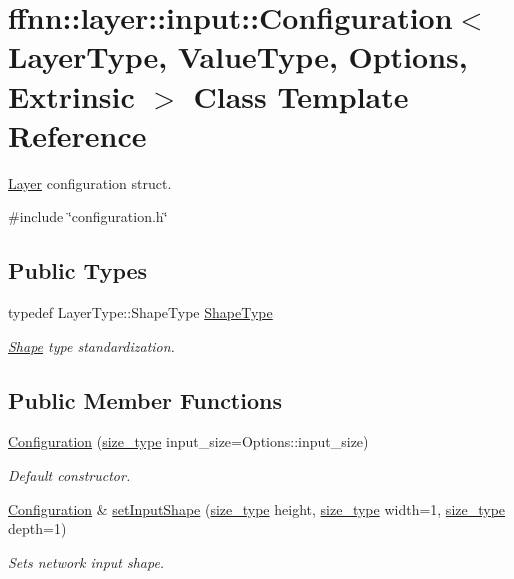 \hypertarget{classffnn_1_1layer_1_1input_1_1_configuration}{\section{ffnn\-:\-:layer\-:\-:input\-:\-:Configuration$<$ Layer\-Type, Value\-Type, Options, Extrinsic $>$ Class Template Reference}
\label{classffnn_1_1layer_1_1input_1_1_configuration}
}


\hyperlink{classffnn_1_1layer_1_1_layer}{Layer} configuration struct.  




{\ttfamily \#include \char`\"{}configuration.\-h\char`\"{}}

\subsection*{Public Types}
\begin{DoxyCompactItemize}
\item 
typedef Layer\-Type\-::\-Shape\-Type \hyperlink{classffnn_1_1layer_1_1input_1_1_configuration_afc336872262117979921b387f4a6a257}{Shape\-Type}
\begin{DoxyCompactList}\small\item\em \hyperlink{structffnn_1_1layer_1_1_shape}{Shape} type standardization. \end{DoxyCompactList}\end{DoxyCompactItemize}
\subsection*{Public Member Functions}
\begin{DoxyCompactItemize}
\item 
\hyperlink{classffnn_1_1layer_1_1input_1_1_configuration_afdf39d6de4b1945d588333f39acc8141}{Configuration} (\hyperlink{namespaceffnn_a63b90a2fd70eb76684eac482a51633e5}{size\-\_\-type} input\-\_\-size=Options\-::input\-\_\-size)
\begin{DoxyCompactList}\small\item\em Default constructor. \end{DoxyCompactList}\item 
\hyperlink{classffnn_1_1layer_1_1input_1_1_configuration}{Configuration} \& \hyperlink{classffnn_1_1layer_1_1input_1_1_configuration_a7e8fb9a27f450176eda6fa92ae9fac4e}{set\-Input\-Shape} (\hyperlink{namespaceffnn_a63b90a2fd70eb76684eac482a51633e5}{size\-\_\-type} height, \hyperlink{namespaceffnn_a63b90a2fd70eb76684eac482a51633e5}{size\-\_\-type} width=1, \hyperlink{namespaceffnn_a63b90a2fd70eb76684eac482a51633e5}{size\-\_\-type} depth=1)
\begin{DoxyCompactList}\small\item\em Sets network input shape. \end{DoxyCompactList}\end{DoxyCompactItemize}
